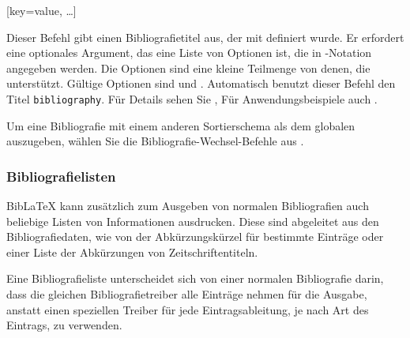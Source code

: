 \documentclass{ltxdockit}[2011/03/25]
\newcommand*{\biblatex}{BibLaTeX\xspace}
\begin{document}
\begin{ltxsyntax}
[key=value, \dots]

Dieser Befehl gibt einen Bibliografietitel aus, der mit 
definiert wurde. Er erfordert eine optionales Argument, das eine Liste von
Optionen ist, die in \keyval-Notation angegeben werden. Die Optionen sind eine
kleine Teilmenge von denen, die  unterstützt. Gültige
Optionen sind  und . Automatisch benutzt dieser Befehl
den Titel \texttt{bibliography}. Für Details sehen Sie , Für
Anwendungsbeispiele auch .  

Um eine Bibliografie mit einem anderen Sortierschema als dem globalen auszugeben,
wählen Sie die Bibliografie-Wechsel-Befehle aus .

\end{ltxsyntax}

\subsubsection{Bibliografielisten}
\label{use:bib:biblist}

\biblatex kann zusätzlich zum Ausgeben von normalen Bibliografien auch beliebige Listen von Informationen ausdrucken. Diese sind  abgeleitet aus den Bibliografiedaten, wie von der
Abkürzungskürzel für bestimmte Einträge oder einer Liste der Abkürzungen von Zeitschriftentiteln.

Eine Bibliografieliste unterscheidet sich von einer normalen Bibliografie darin, dass
die gleichen Bibliografietreiber alle Einträge nehmen für die Ausgabe, anstatt einen speziellen Treiber für jede Eintragsableitung, je nach Art des Eintrags, zu verwenden.   
\end{document}
